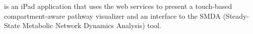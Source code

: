 \mawapp is an iPad application that uses the \pathcasemaw web services to
present a touch-based compartment-aware pathway visualizer and an interface to
the SMDA (Steady-State Metabolic Network Dynamics Analysis) tool.












